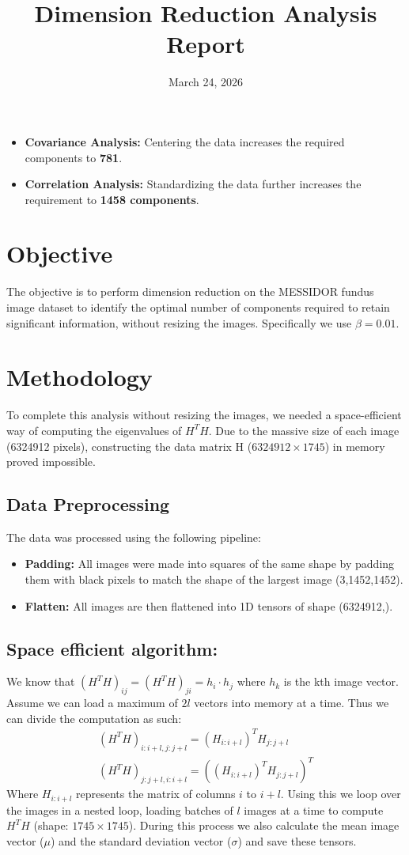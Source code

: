 \documentclass[a4paper,11pt]{article}
\begin{document}
\begin{itemize}
    \item \textbf{Covariance Analysis:} Centering the data increases the required components to \textbf{781}.
    \item \textbf{Correlation Analysis:} Standardizing the data further increases the requirement to \textbf{1458 components}.
\end{itemize}
\clearpage
\title{\textbf{Dimension Reduction Analysis Report}}
\date{March 24, 2026}
\section{Objective}
The objective is to perform dimension reduction on the MESSIDOR fundus image dataset to identify the optimal number of components required to retain significant information, without resizing the images. Specifically we use $\beta = 0.01$.
\section{Methodology}
To complete this analysis without resizing the images, we needed a space-efficient way of computing the eigenvalues of $H^TH$. Due to the massive size of each image (6324912 pixels), constructing the data matrix H ($ 6324912 \times 1745$) in memory proved impossible.
\subsection{Data Preprocessing}
The data was processed using the following pipeline:
\begin{itemize}
    \item \textbf{Padding:} All images were made into squares of the same shape by padding them with black pixels to match the shape of the largest image (3,1452,1452). 
    \item \textbf{Flatten:} All images are then flattened into 1D tensors of shape (6324912,).
\end{itemize}
\subsection{Space efficient algorithm:}
We know that $(H^TH)_{ij} = (H^TH)_{ji} = h_i \cdot h_j$  where $h_k$ is the kth image vector. Assume we can load a maximum of $2l$ vectors into memory at a time. Thus we can divide the computation as such:\\
\begin{align*}
    (H^TH)_{i:i+l,j:j+l} =  (H_{i:i+l})^TH_{j:j+l}\\
    (H^TH)_{j:j+l,i:i+l} = ((H_{i:i+l})^TH_{j:j+l})^T
\end{align*}
Where $H_{i:i+l}$ represents the matrix of columns $i$ to $i+l$. Using this we loop over the images in a nested loop, loading batches of $l$ images at a time to compute $H^TH$ (shape: $1745\times1745$). During this process we also calculate the mean image vector ($\mu$) and the standard deviation vector ($\sigma$) and save these tensors.
\end{document}
